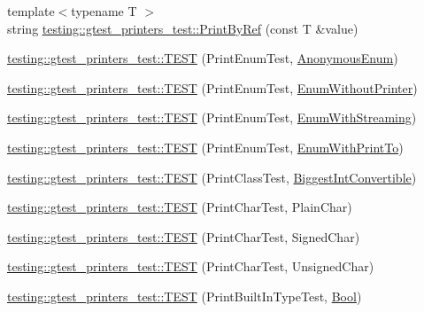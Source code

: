 \begin{DoxyCompactItemize}
{\footnotesize template$<$typename T $>$ }\\string \hyperlink{namespacetesting_1_1gtest__printers__test_a8e4be1dea6a05e53db4fd20d259ffdd7}{testing\+::gtest\+\_\+printers\+\_\+test\+::\+Print\+By\+Ref} (const T \&value)
\item 
\hyperlink{namespacetesting_1_1gtest__printers__test_ac79ac1529e754dddbaff5ba108ba3de3}{testing\+::gtest\+\_\+printers\+\_\+test\+::\+T\+E\+ST} (Print\+Enum\+Test, \hyperlink{gtest-printers__test_8cc_a7a5ee9fe858568a85d80af1312aefb8b}{Anonymous\+Enum})
\item 
\hyperlink{namespacetesting_1_1gtest__printers__test_ae435934e9be88c7813ac6aee2ce0ce53}{testing\+::gtest\+\_\+printers\+\_\+test\+::\+T\+E\+ST} (Print\+Enum\+Test, \hyperlink{gtest-printers__test_8cc_a404f735da62338180a19ae16f80e09c8}{Enum\+Without\+Printer})
\item 
\hyperlink{namespacetesting_1_1gtest__printers__test_a152cda5e11caecc372208103022726d1}{testing\+::gtest\+\_\+printers\+\_\+test\+::\+T\+E\+ST} (Print\+Enum\+Test, \hyperlink{gtest-printers__test_8cc_a52d9f846ca7a081ba3acf88dd6cd46dc}{Enum\+With\+Streaming})
\item 
\hyperlink{namespacetesting_1_1gtest__printers__test_a171e23e5a52e6b7355c00daf8391ec12}{testing\+::gtest\+\_\+printers\+\_\+test\+::\+T\+E\+ST} (Print\+Enum\+Test, \hyperlink{gtest-printers__test_8cc_a904d619d593201ed509be794aed041ec}{Enum\+With\+Print\+To})
\item 
\hyperlink{namespacetesting_1_1gtest__printers__test_a46ee2873cfeb51db5f56be0960ce333b}{testing\+::gtest\+\_\+printers\+\_\+test\+::\+T\+E\+ST} (Print\+Class\+Test, \hyperlink{class_biggest_int_convertible}{Biggest\+Int\+Convertible})
\item 
\hyperlink{namespacetesting_1_1gtest__printers__test_aa0a012b88bd8dee46707bf308aa312d1}{testing\+::gtest\+\_\+printers\+\_\+test\+::\+T\+E\+ST} (Print\+Char\+Test, Plain\+Char)
\item 
\hyperlink{namespacetesting_1_1gtest__printers__test_a08fe11b61c0ff62931f0172dc05c971b}{testing\+::gtest\+\_\+printers\+\_\+test\+::\+T\+E\+ST} (Print\+Char\+Test, Signed\+Char)
\item 
\hyperlink{namespacetesting_1_1gtest__printers__test_a54554ba079349cf09dcb6d522cfb70de}{testing\+::gtest\+\_\+printers\+\_\+test\+::\+T\+E\+ST} (Print\+Char\+Test, Unsigned\+Char)
\item 
\hyperlink{namespacetesting_1_1gtest__printers__test_a6f08c464dc0b8eb822368f552d4467ad}{testing\+::gtest\+\_\+printers\+\_\+test\+::\+T\+E\+ST} (Print\+Built\+In\+Type\+Test, \hyperlink{struct_bool}{Bool})

\end{DoxyCompactItemize}

